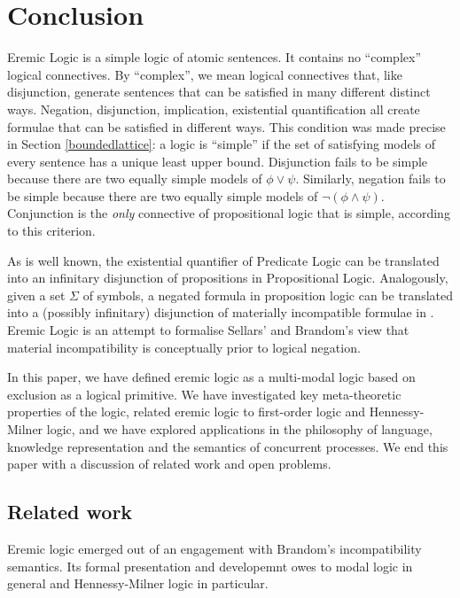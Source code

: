 \section{Conclusion}\label{conclusion}

Eremic Logic is a simple logic of atomic sentences.
It contains no ``complex'' logical connectives.  
By ``complex'', we mean logical
connectives that, like disjunction, generate sentences that can be
satisfied in many different distinct ways.
Negation, disjunction,
implication, existential quantification all create formulae that can
be satisfied in different ways. 
This condition was
made precise in Section \ref{boundedlattice}: a logic is ``simple'' if the set of
satisfying models of every sentence has a unique least upper
bound. 
Disjunction fails to be simple because there are two equally
simple models of $\phi \lor \psi$. 
Similarly, negation fails to be simple
because there are two equally simple models of $\neg (\phi \land
\psi)$. 
Conjunction is the \emph{only} connective of propositional logic that is simple,
according to this criterion.

As is well known, the existential quantifier of Predicate Logic can be translated into an infinitary disjunction of propositions in Propositional Logic.
Analogously, given a set $\Sigma$ of symbols, a negated formula in proposition logic can be translated into a (possibly infinitary)
disjunction of materially incompatible formulae in \ELFULL{}.
Eremic Logic is an attempt to formalise Sellars' and Brandom's view that material incompatibility is conceptually prior to logical negation.

In this paper, we have defined eremic logic as a multi-modal logic based on
exclusion as a logical primitive. 
We have investigated key
meta-theoretic properties of the logic, related eremic logic to
first-order logic and Hennessy-Milner logic, and we have explored
applications in the philosophy of language, knowledge representation
and the semantics of concurrent processes. 
We end this paper with a
discussion of related work and open problems.

\subsection{Related work} 

Eremic logic emerged out of an engagement with Brandom's
incompatibility semantics.  Its formal presentation and developemnt
owes to modal logic in general and Hennessy-Milner logic in
particular.

